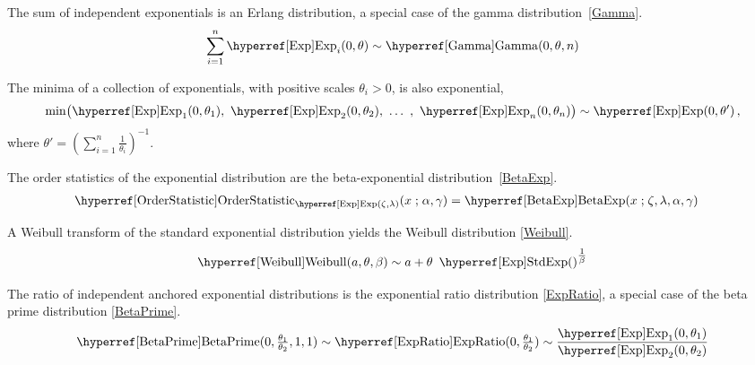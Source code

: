 The sum of independent exponentials is an Erlang distribution, a special case of the gamma distribution~\eqref{Gamma}.
\[
\sum_{i=1}^{n} \opr{Exp}_i(0,\theta) \sim \opr{Gamma}(0, \theta, n) \checked
\notag
\]


The minima of a collection of exponentials, with positive scales $\theta_i>0$, is  also exponential,
\[
\op{min}\bigl( \opr{Exp}_1(0,\theta_1),\ \opr{Exp}_2(0,\theta_2),\ \ldots\ ,\ \opr{Exp}_n(0,\theta_n) \bigr) \sim \opr{Exp}(0, \theta') \, , \checked
\notag
\]
where $\theta' = (\sum_{i=1}^{n} \tfrac{1}{\theta_i})^{-1}$. \checked


The order statistics  of the exponential distribution are the beta-exponential distribution~\eqref{BetaExp}.
\begin{align*}
\opr{OrderStatistic}&_{\opr{Exp}(\pLoc,\pScale)}  (x \given \alpha, \gamma) =  \opr{BetaExp}(x\given \pLoc, \pScale, \alpha, \gamma)  \checked
\notag
\end{align*}


A Weibull transform of the standard exponential distribution yields the Weibull distribution  \eqref{Weibull}.
\[
\opr{Weibull}(a,\theta,\beta) \sim a+ \theta\ \oprr{StdExp}{Exp}()^{\tfrac{1}{\beta}} \checked
\notag
\]


The ratio of independent anchored exponential distributions is the exponential ratio distribution \eqref{ExpRatio}, a special case of the beta prime distribution \eqref{BetaPrime}.
\label{sec:ExpRatio}
\[
\opr{BetaPrime}(0,\tfrac{\theta_1}{\theta_2} , 1,1) \sim \opr{ExpRatio}(0,\tfrac{\theta_1}{\theta_2}) \sim \frac{\opr{Exp}_1(0,\theta_1)}{\opr{Exp}_2(0,\theta_2) }
\notag
\]

